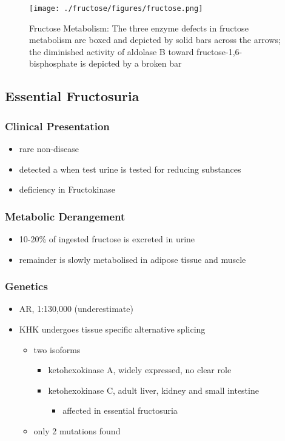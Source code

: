 \documentclass{scrartcl}
\begin{document}
\begin{figure}[htbp]
\centering
\texttt{[image: ./fructose/figures/fructose.png]}
\caption[Fructose]{\label{fig:org347bb49}
Fructose Metabolism: The three enzyme defects in fructose metabolism are boxed and depicted by solid bars across the arrows; the diminished activity of aldolase B toward fructose-1,6-bisphosphate is depicted by a broken bar}
\end{figure}

\subsection{Essential Fructosuria}
\label{sec:orgcaf7b5f}
\subsubsection{Clinical Presentation}
\label{sec:orgca11819}
\begin{itemize}
\item rare non-disease
\item detected a when test urine is tested for reducing substances
\item deficiency in Fructokinase
\end{itemize}
\subsubsection{Metabolic Derangement}
\label{sec:org16e460b}
\begin{itemize}
\item 10-20\% of ingested fructose is excreted in urine
\item remainder is slowly metabolised in adipose tissue and muscle
\end{itemize}
\subsubsection{Genetics}
\label{sec:org4f65b45}
\begin{itemize}
\item AR, 1:130,000 (underestimate)
\item KHK undergoes tissue specific alternative splicing
\begin{itemize}
\item two isoforms
\begin{itemize}
\item ketohexokinase A, widely expressed, no clear role
\item ketohexokinase C, adult liver, kidney and small intestine
\begin{itemize}
\item affected in essential fructosuria
\end{itemize}
\end{itemize}
\item only 2 mutations found
\end{itemize}
\end{itemize}
\end{document}
